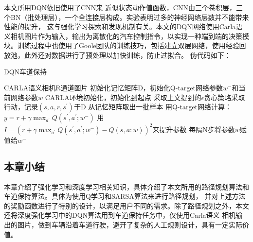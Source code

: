 本文所用DQN依旧使用了CNN来 近似状态动作值函数，CNN由三个卷积层，三个BN（批处理层），一个全连接层构成。实验表明过多的神经网络层数并不能带来性能的提升，
这与强化学习探索和发现机制有关。本文的DQN网络使用Carla语义相机图片作为输入，输出为离散化的汽车控制指令，以实现一种端到端的决策模块。训练过程中也使用了Goole团队的训练技巧，包括建立双层网络，使用经验回放池，此外还对数据进行了预处理以加快训练，防止过拟合。
伪代码如下：\\
\begin{algorithm}[H]  
  \caption{DQN车道保持}  
  \begin{algorithmic}[1] 
    \Require CARLA语义相机R通道图片
    \Ensure 
    \State 初始化记忆矩阵D，初始化Q-target网络参数$w^{-}$和当前网络参数$w$
    \State CARLA环境初始化，初始化到起点
    \State 采取上文提到的$\epsilon$贪心策略采取行动，记录$(s,a,r,s^{'})$于D
    \State 从记忆矩阵取出一批样本
    \State 用Q-target网络计算：$y=r+\gamma\max_{a^{'}}Q(s^{'},a^{'};w^{-})$
    \State 用$I=(r+\gamma\max_{a^{'}}Q(s^{'},a^{'};w^{-})-Q(s,a:w))^2$来提升参数
    \State 每隔N步将参数$w$赋值给$w^{-}$

    \EndFor
    \EndFor
     
  \end{algorithmic}  
\end{algorithm}
\subsection{本章小结}
本章介绍了强化学习和深度学习相关知识，具体介绍了本文所用的路径规划算法和车道保持算法。具体为使用Q学习和SARSA算法来进行路径规划，
并对上述方法的奖励函数进行了特别的设计，以满足用户不同的需求。除了路径规划之外，本文还将深度强化学习中的DQN算法用到车道保持任务中，仅使用Carla语义
相机输出的图片，做到车辆沿着车道行驶，避开了复杂的人工规则设计，具有一定实际价值。